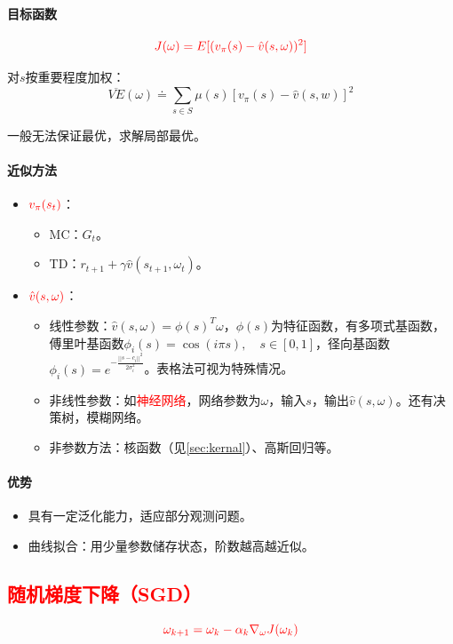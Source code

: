 \documentclass[
12pt, %
a4paper, 
oneside, %
]{scrartcl}
\begin{document}
\paragraph{目标函数}
$$ \textcolor{red}{J(\omega) = E[(v_{\pi}(s) - \hat{v}(s, \omega))^2]} $$

对$ s $按重要程度加权：
$$ \overline{VE}(\omega) \doteq \sum_{s \in S} \mu(s) [v_\pi(s) - \hat{v}(s, w)]^2 $$

一般无法保证最优，求解局部最优。
\paragraph{近似方法}\label{sec:kernal back}
\begin{itemize}
\item $ \textcolor{red}{v_\pi(s_t)} $：
\begin{itemize}
\item MC：$ G_t $。
\item TD：$ r_{t + 1} + \gamma \hat{v}(s_{t + 1}, \omega_t) $。
\end{itemize}
\item $ \textcolor{red}{\hat{v}(s, \omega)} $：
\begin{itemize}
\item 线性参数：$ \hat{v}(s, \omega) = \phi(s)^T \omega $，$ \phi(s) $为特征函数，有多项式基函数，傅里叶基函数$ \phi_i(s) = \cos(i \pi s), \quad s \in [0, 1] $，径向基函数$ \phi_i(s) = e^{-\frac{||s - c_i||^2}{2\sigma_i^2}} $。表格法可视为特殊情况。
\item 非线性参数：如\textcolor{red}{神经网络}，网络参数为$ \omega $，输入$ s $，输出$ \hat{v}(s, \omega) $。还有决策树，模糊网络。
\item 非参数方法：核函数（见\ref{sec:kernal}）、高斯回归等。
\end{itemize}
\end{itemize}
\paragraph{优势}
\begin{itemize}
\item 具有一定泛化能力，适应部分观测问题。
\item 曲线拟合：用少量参数储存状态，阶数越高越近似。
\end{itemize}
\subsection[随机梯度下降]{\textcolor{red}{随机梯度下降（SGD）}}
$$ \textcolor{red}{\omega_{k + 1} = \omega_k - \alpha_k \nabla_\omega J(\omega_k)} $$
\end{document}
